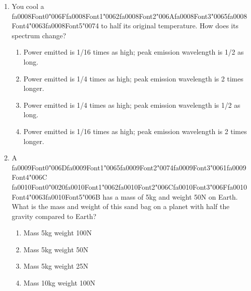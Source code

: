 \documentclass[12pt]{article}
\begin{document}
\begin{enumerate}[label=\arabic*.]
\begin{enumerate}[label=(\alph*)]
    \item 2:3 periodic ratio of Neptune:Pluto
    \item Kirkwood Gaps.
    \item Gaps in Saturn's rings.
    \item Breaking of small Jovian moons to form ring materials.
\end{enumerate}
\item You cool a {\csname fa0008Font0\endcsname\char"006F}{\csname fa0008Font1\endcsname\char"0062}{\csname fa0008Font2\endcsname\char"006A}{\csname fa0008Font3\endcsname\char"0065}{\csname fa0008Font4\endcsname\char"0063}{\csname fa0008Font5\endcsname\char"0074} to half its original temperature. How does its spectrum change?
\begin{enumerate}[label=(\alph*)]
    \item Power emitted is 1/16 times as high; peak emission wavelength is 1/2 as long.
    \item Power emitted is 1/4 times as high; peak emission wavelength is 2 times longer.
    \item Power emitted is 1/4 times as high; peak emission wavelength is 1/2 as long.
    \item Power emitted is 1/16 times as high; peak emission wavelength is 2 times longer.
\end{enumerate}
\item A {\csname fa0009Font0\endcsname\char"006D}{\csname fa0009Font1\endcsname\char"0065}{\csname fa0009Font2\endcsname\char"0074}{\csname fa0009Font3\endcsname\char"0061}{\csname fa0009Font4\endcsname\char"006C} {\csname fa0010Font0\endcsname\char"0020}{\csname fa0010Font1\endcsname\char"0062}{\csname fa0010Font2\endcsname\char"006C}{\csname fa0010Font3\endcsname\char"006F}{\csname fa0010Font4\endcsname\char"0063}{\csname fa0010Font5\endcsname\char"006B} has a mass of 5kg and weight 50N on Earth. What is the mass and weight of this
sand bag on a planet with half the gravity compared to Earth?
\begin{enumerate}[label=(\alph*)]
    \item Mass 5kg weight 100N
    \item Mass 5kg weight 50N
    \item Mass 5kg weight 25N
    \item Mass 10kg weight 100N
\end{enumerate}

\end{enumerate}
\end{document}
